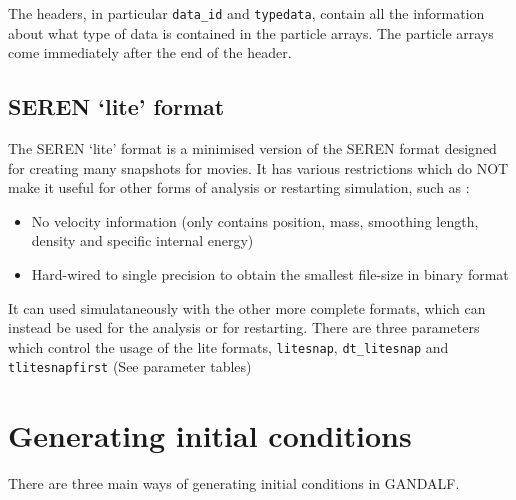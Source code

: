 \documentclass[a4paper]{article}
\newcommand{\var}[1]{\texttt{#1}}
\begin{document}
The headers, in particular \var{data\_id} and \var{typedata}, contain all the information about what type of data is contained in the particle arrays. The particle arrays come immediately after the end of the header.



\subsection{SEREN `lite' format}
The SEREN `lite' format is a minimised version of the SEREN format designed for creating many snapshots for movies.  It has various restrictions which do NOT make it useful for other forms of analysis or restarting simulation, such as :
\begin{itemize}
\item No velocity information (only contains position, mass, smoothing length, density and specific internal energy)
\item Hard-wired to single precision to obtain the smallest file-size in binary format
\end{itemize}
It can used simulataneously with the other more complete formats, which can instead be used for the analysis or for restarting.  There are three parameters which control the usage of the lite formats, \var{litesnap}, \var{dt\_litesnap} and \var{tlitesnapfirst} (See parameter tables)


\newpage



\section{Generating initial conditions}

There are three main ways of generating initial conditions in GANDALF.

\end{document}
